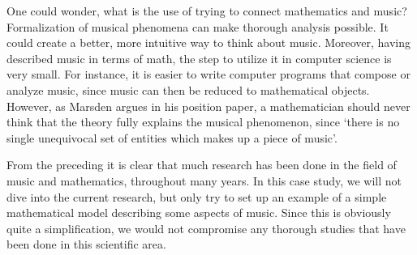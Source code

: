 \documentclass[a4paper]{book}
\theoremstyle{definition}
\begin{document}

One could wonder, what is the use of trying to connect mathematics and music?
Formalization of musical phenomena can make thorough analysis possible.
It could create a better, more intuitive way to think about music.
Moreover, having described music in terms of math, the step to utilize it in computer science is very small.
For instance, it is easier to write computer programs that compose or analyze music, since music can then be reduced to mathematical objects.
However, as Marsden argues in his position paper, a mathematician should never think that the theory fully explains the musical phenomenon, since `there is no single unequivocal set of entities which makes up a piece of music'.
\cite{Marsden}

From the preceding it is clear that much research has been done in the field of music and mathematics, throughout many years.
In this case study, we will not dive into the current research, but only try to set up an example of a simple mathematical model describing some aspects of music.
Since this is obviously quite a simplification, we would not compromise any thorough studies that have been done in this scientific area.
\end{document}
